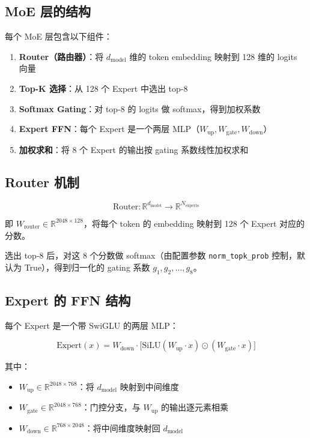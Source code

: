\documentclass[a4paper]{article}
\begin{document}
\subsection{MoE 层的结构}

每个 MoE 层包含以下组件：

\begin{enumerate}
  \item \textbf{Router（路由器）}：将 $d_{\text{model}}$ 维的 token embedding 映射到 128 维的 logits 向量
  \item \textbf{Top-K 选择}：从 128 个 Expert 中选出 top-8
  \item \textbf{Softmax Gating}：对 top-8 的 logits 做 softmax，得到加权系数
  \item \textbf{Expert FFN}：每个 Expert 是一个两层 MLP（$W_{\text{up}}, W_{\text{gate}}, W_{\text{down}}$）
  \item \textbf{加权求和}：将 8 个 Expert 的输出按 gating 系数线性加权求和
\end{enumerate}

\subsection{Router 机制}

$$
\text{Router}: \mathbb{R}^{d_{\text{model}}} \to \mathbb{R}^{N_{\text{experts}}}
$$

即 $W_{\text{router}} \in \mathbb{R}^{2048 \times 128}$，将每个 token 的 embedding 映射到 128 个 Expert 对应的分数。

选出 top-8 后，对这 8 个分数做 softmax（由配置参数 \texttt{norm\_topk\_prob} 控制，默认为 True），得到归一化的 gating 系数 $g_1, g_2, \ldots, g_8$。

\subsection{Expert 的 FFN 结构}

每个 Expert 是一个带 SwiGLU 的两层 MLP：

$$
\text{Expert}(x) = W_{\text{down}} \cdot \big[ \text{SiLU}(W_{\text{up}} \cdot x) \odot (W_{\text{gate}} \cdot x) \big]
$$

其中：
\begin{itemize}
  \item $W_{\text{up}} \in \mathbb{R}^{2048 \times 768}$：将 $d_{\text{model}}$ 映射到中间维度
  \item $W_{\text{gate}} \in \mathbb{R}^{2048 \times 768}$：门控分支，与 $W_{\text{up}}$ 的输出逐元素相乘
  \item $W_{\text{down}} \in \mathbb{R}^{768 \times 2048}$：将中间维度映射回 $d_{\text{model}}$
\end{itemize}
\end{document}
